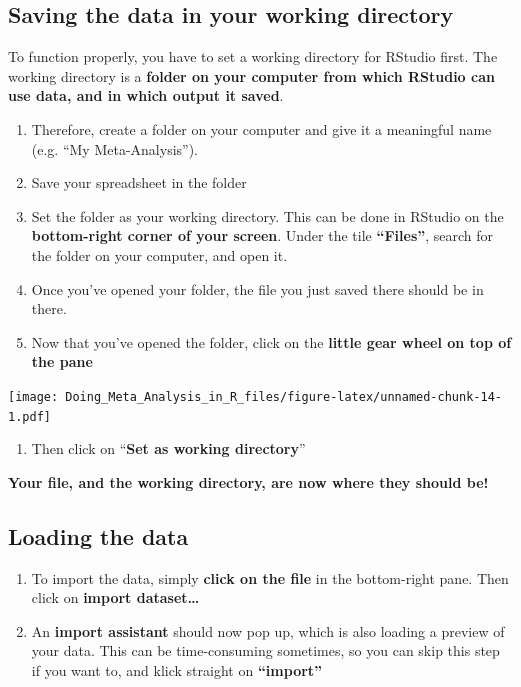 \documentclass[]{book}
\providecommand{\tightlist}{%
  \setlength{\itemsep}{0pt}\setlength{\parskip}{0pt}}
\begin{document}
\hypertarget{saving-the-data-in-your-working-directory}{%
\subsection{Saving the data in your working directory}\label{saving-the-data-in-your-working-directory}}

To function properly, you have to set a working directory for RStudio first. The working directory is a \textbf{folder on your computer from which RStudio can use data, and in which output it saved}.

\begin{enumerate}
\def\labelenumi{\arabic{enumi}.}
\tightlist
\item
  Therefore, create a folder on your computer and give it a meaningful name (e.g. ``My Meta-Analysis'').
\item
  Save your spreadsheet in the folder
\item
  Set the folder as your working directory. This can be done in RStudio on the \textbf{bottom-right corner of your screen}. Under the tile \textbf{``Files''}, search for the folder on your computer, and open it.
\item
  Once you've opened your folder, the file you just saved there should be in there.
\item
  Now that you've opened the folder, click on the \textbf{little gear wheel on top of the pane}
\end{enumerate}

\texttt{[image: Doing\_Meta\_Analysis\_in\_R\_files/figure-latex/unnamed-chunk-14-1.pdf]}

\begin{enumerate}
\def\labelenumi{\arabic{enumi}.}
\setcounter{enumi}{5}
\tightlist
\item
  Then click on ``\textbf{Set as working directory}''
\end{enumerate}

\textbf{Your file, and the working directory, are now where they should be!}

\hypertarget{loading-the-data}{%
\subsection{Loading the data}\label{loading-the-data}}

\begin{enumerate}
\def\labelenumi{\arabic{enumi}.}
\tightlist
\item
  To import the data, simply \textbf{click on the file} in the bottom-right pane. Then click on \textbf{import dataset\ldots{}}
\item
  An \textbf{import assistant} should now pop up, which is also loading a preview of your data. This can be time-consuming sometimes, so you can skip this step if you want to, and klick straight on \textbf{``import''}
\end{enumerate}
\end{document}
